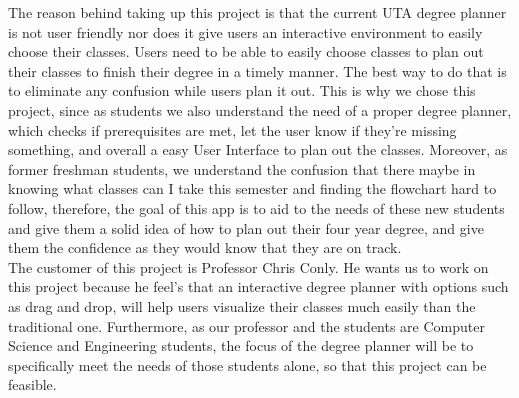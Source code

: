 The reason behind taking up this project is that the current UTA degree planner is not user friendly nor does it give users an interactive environment to easily choose their classes. Users need to be able to easily choose classes to plan out their classes to finish their degree in a timely manner. The best way to do that is to eliminate any confusion while users plan it out. This is why we chose this project, since as students we also understand the need of a proper degree planner, which checks if prerequisites are met, let the user know if they're missing something, and overall a easy User Interface to plan out the classes. Moreover, as former freshman students, we understand the confusion that there maybe in knowing what classes can I take this semester and finding the flowchart hard to follow, therefore, the goal of this app is to aid to the needs of these new students and give them a solid idea of how to plan out their four year degree, and give them the confidence as they would know that they are on track.\\

The customer of this project is Professor Chris Conly. He wants us to work on this project because he feel's that an interactive degree planner with options such as drag and drop, will help users visualize their classes much easily than the traditional one. Furthermore, as our professor and the students are Computer Science and Engineering students, the focus of the degree planner will be to specifically meet the needs of those students alone, so that this project can be feasible.
